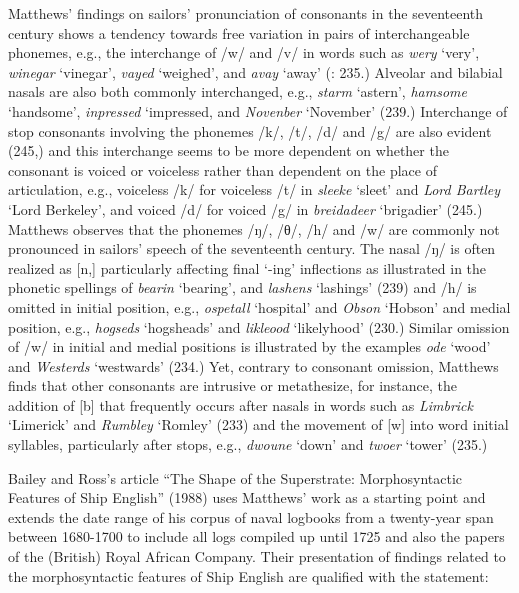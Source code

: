 Matthews’ findings on sailors’ pronunciation of consonants in the seventeenth century shows a tendency towards free variation in pairs of interchangeable phonemes, e.g., the interchange of /w/ and /v/ in words such as \textit{wery} ‘very’, \textit{winegar} ‘vinegar’, \textit{vayed} ‘weighed’, and \textit{avay} ‘away’ (\citealt{Matthews1935}: 235.) Alveolar and bilabial nasals are also both commonly interchanged, e.g., \textit{starm} ‘astern’, \textit{hamsome} ‘handsome’, \textit{inpressed} ‘impressed, and \textit{Novenber} ‘November’ (239.) Interchange of stop consonants involving the phonemes /k/, /t/, /d/ and /g/ are also evident (245,) and this interchange seems to be more dependent on whether the consonant is voiced or voiceless rather than dependent on the place of articulation, e.g., voiceless /k/ for voiceless /t/ in \textit{sleeke} ‘sleet’ and \textit{Lord Bartley} ‘Lord Berkeley’, and voiced /d/ for voiced /g/ in \textit{breidadeer} ‘brigadier’ (245.) Matthews observes that the phonemes /ŋ/, /θ/, /h/ and /w/ are commonly not pronounced in sailors’ speech of the seventeenth century. The nasal /ŋ/ is often realized as [n,] particularly affecting final ‘-ing’ inflections as illustrated in the phonetic spellings of \textit{bearin} ‘bearing’, and \textit{lashens} ‘lashings’ (239) and /h/ is omitted in initial position, e.g., \textit{ospetall} ‘hospital’ and \textit{Obson} ‘Hobson’ and medial position, e.g., \textit{hogseds} ‘hogsheads’ and \textit{likleood} ‘likelyhood’ (230.) Similar omission of /w/ in initial and medial positions is illustrated by the examples \textit{ode} ‘wood’ and \textit{Westerds} ‘westwards’ (234.) Yet, contrary to consonant omission, Matthews finds that other consonants are intrusive or metathesize, for instance, the addition of [b] that frequently occurs after nasals in words such as \textit{Limbrick} ‘Limerick’ and \textit{Rumbley} ‘Romley’ (233) and the movement of [w] into word initial syllables, particularly after stops, e.g., \textit{dwoune} ‘down’ and \textit{twoer} ‘tower’ (235.)

Bailey and Ross’s article “The Shape of the Superstrate: Morphosyntactic Features of Ship English” (1988) uses Matthews’ work as a starting point and extends the date range of his corpus of naval logbooks from a twenty-year span between 1680-1700 to include all logs compiled up until 1725 and also the papers of the (British) Royal African Company. Their presentation of findings related to the morphosyntactic features of Ship English are qualified with the statement:

